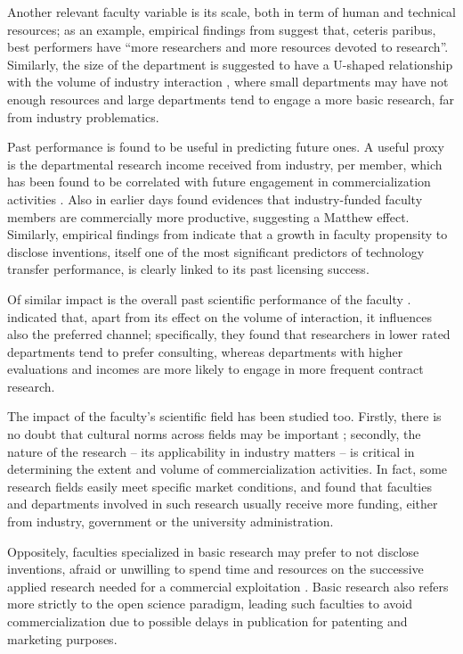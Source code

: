 Another relevant faculty variable is its scale, both in term of human and technical resources; as an example, empirical findings from \citet{OwenSmith2001} suggest that, ceteris paribus, best performers have \enquote{more researchers and more resources devoted to research}. Similarly, the size of the department is suggested to have a U-shaped relationship with the volume of industry interaction \citep{DEste2007}, where small departments may have not enough resources and large departments tend to engage a more basic research, far from industry problematics.

Past performance is found to be useful in predicting future ones. A useful proxy is the departmental research income received from industry, per member, which has been found to be correlated with future engagement in commercialization activities \citep{DEste2007}. Also \citet{Blumenthal1996} in earlier days found evidences that industry-funded faculty members are commercially more productive, suggesting a Matthew effect. Similarly, empirical findings from \citet{Thursby2002} indicate that a growth in faculty propensity to disclose inventions, itself one of the most significant predictors of technology transfer performance, is clearly linked to its past licensing success. 

Of similar impact is the overall past scientific performance of the faculty \citep{OShea2005}. \citet{DEste2011} indicated that, apart from its effect on the volume of interaction, it influences also the preferred channel; specifically, they found that researchers in lower rated departments tend to prefer consulting, whereas departments with higher evaluations and incomes are more likely to engage in more frequent contract research.

The impact of the faculty's scientific field has been studied too. Firstly, there is no doubt that cultural norms across fields may be important \citep{DEste2007}; secondly, the nature of the research – its applicability in industry matters – is critical in determining the extent and volume of commercialization activities. In fact, some research fields easily meet specific market conditions, and \citet{OShea2005} found that faculties and departments involved in such research usually receive more funding, either from industry, government or the university administration.

Oppositely, faculties specialized in basic research may prefer to not disclose inventions, afraid or unwilling to spend time and resources on the successive applied research needed for a commercial exploitation \citep{Bercovitz2006}. Basic research also refers more strictly to the open science paradigm, leading such faculties to avoid commercialization due to possible delays in publication for patenting and marketing purposes. 

